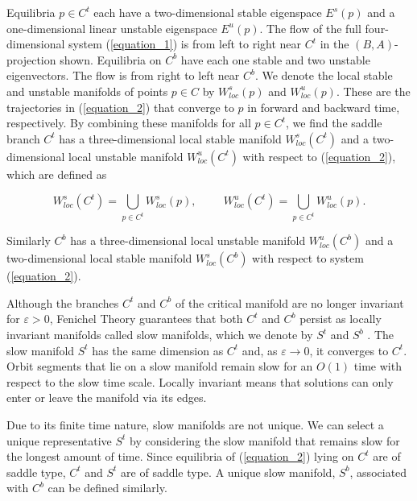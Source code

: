 \documentclass{ws-ijbc}
\begin{document}
Equilibria $p \in C^t$ each have a two-dimensional stable eigenspace $E^s(p)$ and a one-dimensional linear unstable eigenspace $E^u(p)$.  The flow of the full four-dimensional system (\ref{equation_1}) is from left to right near $C^t$ in the $(B,A)$-projection shown.  Equilibria on $C^b$ have each one stable and two unstable eigenvectors.  The flow is from right to left near $C^b$.  We denote the local stable and unstable manifolds of points $p \in C$ by $W^{s}_{loc}(p)$ and $W^{u}_{loc}(p)$.  These are the trajectories in (\ref{equation_2}) that converge to $p$ in forward and backward time, respectively.  By combining these manifolds for all $p \in C^t$, we find the saddle branch $C^t$ has a three-dimensional local stable manifold $W^{s}_{loc}(C^t)$ and a two-dimensional local unstable manifold $W^{u}_{loc}(C^t)$ with respect to (\ref{equation_2}), which are defined as
    
$$W^{s}_{loc}(C^t) = \bigcup_{p \in C^t} W^{s}_{loc}(p), \hspace{1cm} W^{u}_{loc}(C^t) = \bigcup_{p \in C^t} W^{u}_{loc}(p).$$
    
\noindent
Similarly $C^b$ has a three-dimensional local unstable manifold $W^{u}_{loc}(C^b)$ and a two-dimensional local stable manifold $W^{s}_{loc}(C^b)$ with respect to system (\ref{equation_2}).
    
Although the branches $C^t$ and $C^b$ of the critical manifold are no longer invariant for $\varepsilon > 0$, Fenichel Theory guarantees that both $C^t$ and $C^b$ persist as locally invariant manifolds called slow manifolds, which we denote by $S^t$ and $S^b$ \cite{Fenichel}. The slow manifold $S^t$ has the same dimension as $C^t$ and, as $\varepsilon \rightarrow 0$, it converges to $C^t$.  Orbit segments that lie on a slow manifold remain slow for an $O(1)$ time with respect to the slow time scale.  Locally invariant means that solutions can only enter or leave the manifold via its edges.  
    
Due to its finite time nature, slow manifolds are not unique.  We can select a unique representative $S^t$ by considering the slow manifold that remains slow for the longest amount of time.  Since equilibria of (\ref{equation_2}) lying on $C^t$ are of saddle type, $C^t$ and $S^t$ are of saddle type.  A unique slow manifold, $S^b$, associated with $C^b$ can be defined similarly.
    
\end{document}
